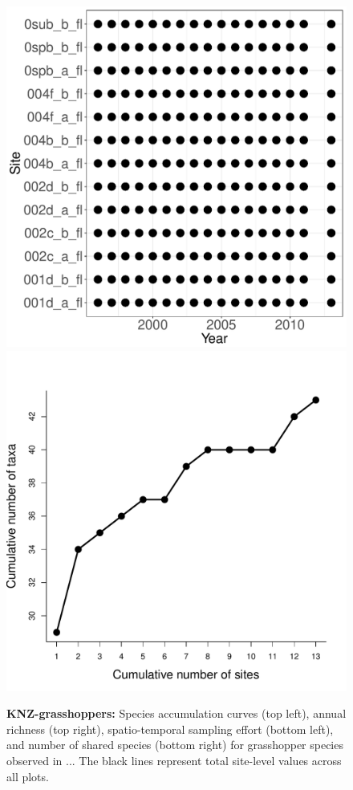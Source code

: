 \documentclass[11pt, oneside]{article}
\begin{document}
\begin{figure}[h!]
\includegraphics[scale = 0.4]{knz-grasshopper-compagnoni_spatiotemporal_sampling_effort.pdf}
\includegraphics[scale = 0.4]{knz-grasshopper-compagnoni_species_accumulation_space.pdf}
\caption{{\bf KNZ-grasshoppers:} Species accumulation curves (top left),  annual richness (top right), spatio-temporal sampling effort (bottom left), and number of shared species (bottom right) for grasshopper species observed in ... The black lines represent total site-level values across all plots.}
\label{knz-grasshoppers}
\end{figure}
\end{document}
